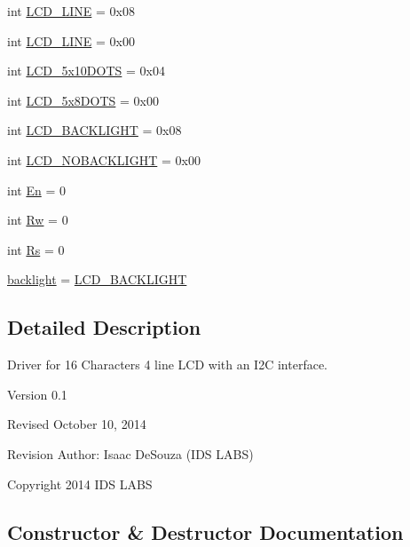 \begin{DoxyCompactItemize}
\item 
int \hyperlink{classdriver_1_1DRIVER__CORE_1_1LCD_ac97658d938932fa1892710fb3ef90810}{L\+C\+D\+\_\+L\+I\+N\+E} = 0x08
\item 
int \hyperlink{classdriver_1_1DRIVER__CORE_1_1LCD_a98fef7ca8bf4cdb9f24a5de4ea96a333}{L\+C\+D\+\_\+L\+I\+N\+E} = 0x00
\item 
int \hyperlink{classdriver_1_1DRIVER__CORE_1_1LCD_ab2cbbad00261182306066b6c0a5833cf}{L\+C\+D\+\_\+5x10\+D\+O\+T\+S} = 0x04
\item 
int \hyperlink{classdriver_1_1DRIVER__CORE_1_1LCD_a3827f35e7fdc2e87e310b96946ea4a31}{L\+C\+D\+\_\+5x8\+D\+O\+T\+S} = 0x00
\item 
int \hyperlink{classdriver_1_1DRIVER__CORE_1_1LCD_a451bdfdb9070424538d887ff2537cbd4}{L\+C\+D\+\_\+\+B\+A\+C\+K\+L\+I\+G\+H\+T} = 0x08
\item 
int \hyperlink{classdriver_1_1DRIVER__CORE_1_1LCD_ab91efc280a324865386ba4225edb938c}{L\+C\+D\+\_\+\+N\+O\+B\+A\+C\+K\+L\+I\+G\+H\+T} = 0x00
\item 
int \hyperlink{classdriver_1_1DRIVER__CORE_1_1LCD_a2bd95d3e054fb4f31d460e0f6cc5d4b9}{En} = 0
\item 
int \hyperlink{classdriver_1_1DRIVER__CORE_1_1LCD_a3d390e26af88fa58f0a5a2071c2dadc4}{Rw} = 0
\item 
int \hyperlink{classdriver_1_1DRIVER__CORE_1_1LCD_a3b3638ad9241c610826a457a208db03e}{Rs} = 0
\item 
\hyperlink{classdriver_1_1DRIVER__CORE_1_1LCD_a3859d28df51e47968c03ff79c6d6ddcb}{backlight} = \hyperlink{classdriver_1_1DRIVER__CORE_1_1LCD_a451bdfdb9070424538d887ff2537cbd4}{L\+C\+D\+\_\+\+B\+A\+C\+K\+L\+I\+G\+H\+T}
\end{DoxyCompactItemize}


\subsection{Detailed Description}
\begin{DoxyVerb}Driver for 16 Characters 4 line LCD with an I2C interface.

Version 0.1

Revised October 10, 2014

Revision Author: Isaac DeSouza (IDS LABS)

Copyright 2014 IDS LABS
\end{DoxyVerb}
 

\subsection{Constructor \& Destructor Documentation}
\hypertarget{classdriver_1_1DRIVER__CORE_1_1LCD_a42d8dfae2030675de36c798311a4c081}{}

